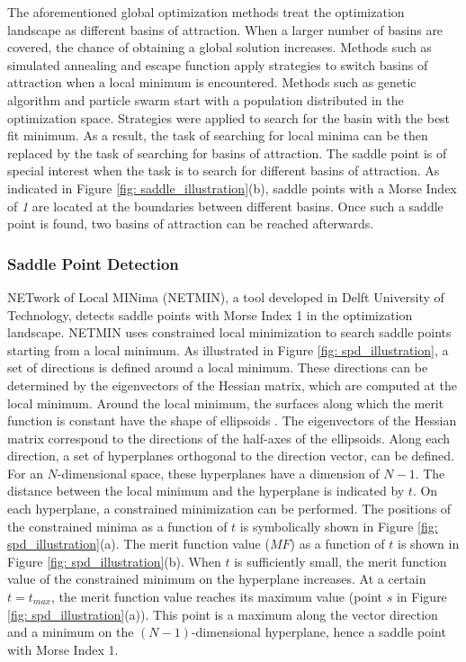 The aforementioned global optimization methods treat the optimization landscape as different basins of attraction. When a larger number of basins are covered, the chance of obtaining a global solution increases. Methods such as simulated annealing and escape function apply strategies to switch basins of attraction when a local minimum is encountered. Methods such as genetic algorithm and particle swarm start with a population distributed in the optimization space. Strategies were applied to search for the basin with the best fit minimum. As a result, the task of searching for local minima can be then replaced by the task of searching for basins of attraction. The saddle point is of special interest when the task is to search for different basins of attraction. As indicated in Figure \ref{fig: saddle_illustration}(b), saddle points with a Morse Index of \textit{1} are located at the boundaries between different basins. Once such a saddle point is found, two basins of attraction can be reached afterwards.

\subsubsection{Saddle Point Detection \label{method: spd}}

NETwork of Local MINima (NETMIN), a tool developed in Delft University of Technology, detects saddle points with Morse Index 1 in the optimization landscape. NETMIN uses constrained local minimization to search saddle points starting from a local minimum. As illustrated in Figure \ref{fig: spd_illustration}, a set of directions is defined around a local minimum. These directions can be determined by the eigenvectors of the Hessian matrix, which are computed at the local minimum. Around the local minimum, the surfaces along which the merit function is constant have the shape of ellipsoids \cite{MarinescuSPD07}. The eigenvectors of the Hessian matrix correspond to the directions of the half-axes of the ellipsoids. Along each direction, a set of hyperplanes orthogonal to the direction vector, can be defined. For an $N$-dimensional space, these hyperplanes have a dimension of $N-1$. The distance between the local minimum and the hyperplane is indicated by $t$. On each hyperplane, a constrained minimization can be performed. The positions of the constrained minima as a function of  $t$ is symbolically shown in Figure \ref{fig: spd_illustration}(a). The merit function value ($MF$) as a function of $t$ is shown in Figure \ref{fig: spd_illustration}(b). When $t$ is sufficiently small, the merit function value of the constrained minimum on the hyperplane increases. At a certain $t = t_{max}$, the merit function value reaches its maximum value (point $s$ in Figure \ref{fig: spd_illustration}(a)). This point is a maximum along the vector direction and a minimum on the $(N-1)$-dimensional hyperplane, hence a saddle point with Morse Index 1.  

